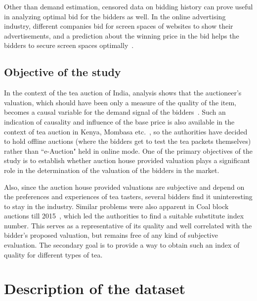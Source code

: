 \documentclass[a4paper,12pt]{article}
\begin{document}
Other than demand estimation, censored data on bidding history can prove useful in analyzing optimal bid for the bidders as well. In the online advertising industry, different companies bid for screen spaces of websites to show their advertisements, and a prediction about the winning price in the bid helps the bidders to secure screen spaces optimally~\cite{wu2015predicting}.


\subsection{Objective of the study}\label{sec:goal}

In the context of the tea auction of India, analysis shows that the auctioneer's valuation, which should have been only a measure of the quality of the item, becomes a causal variable for the demand signal of the bidders~\cite{dalal2020information}. Such an indication of causality and influence of the base price is also available in the context of tea auction in Kenya, Mombasa etc.~\cite{graham2019digital}, so the authorities have decided to hold offline auctions (where the bidders get to test the tea packets themselves) rather than ``e-Auction" held in online mode. One of the primary objectives of the study is to establish whether auction house provided valuation plays a significant role in the determination of the valuation of the bidders in the market. 

Also, since the auction house provided valuations are subjective and depend on the preferences and experiences of tea tasters, several bidders find it uninteresting to stay in the industry. Similar problems were also apparent in Coal block auctions till 2015~\cite{hariani2018auction}, which led the authorities to find a suitable substitute index number. This serves as a representative of its quality and well correlated with the bidder's proposed valuation, but remains free of any kind of subjective evaluation. The secondary goal is to provide a way to obtain such an index of quality for different types of tea.


\section{Description of the dataset}
\end{document}
